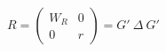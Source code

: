 \begin{equation}
R=\left(
\begin{array}{cc}
W_{R} & 0 \\
0 & r
\end{array}
\right) = G'~\Delta~G'
\end{equation}

